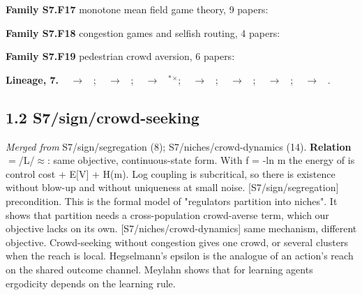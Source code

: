 \documentclass[10pt]{article}
\newcommand{\memb}[1]{\par\smallskip\textbf{#1}\quad}
\begin{document}
\memb{Family S7.F17} monotone mean field game theory, 9 papers: {\footnotesize \citetext{\citealp{Lasry-mean07}; \citealp{Lasry-jeux06a}; \citealp{Lasry-jeux06b}; \citealp{Gueant-mean11}; \citealp{Bensoussan-mean13}\dag; \citealp{Bardi-linear14}; \citealp{Carmona-probabilistic18}\dag; \citealp{Cardaliaguet-introduction20}\dag; \citealp{Bakaryan-regularity23}}}

\memb{Family S7.F18} congestion games and selfish routing, 4 papers: {\footnotesize \citetext{\citealp{Wardrop-some52}\dag; \citealp{Rosenthal-class73}\dag; \citealp{Milchtaich-congestion96}\dag; \citealp{Roughgarden-how02}}}

\memb{Family S7.F19} pedestrian crowd aversion, 6 papers: {\footnotesize \citetext{\citealp{Hughes-continuum02}; \citealp{Lachapelle-mean11}; \citealp{Aurell-mean18}; \citealp{Bonnemain-schrodinger20}; \citealp{Bonnemain-pedestrians22}; \citealp{Po-rerouting24}}}

\memb{Lineage, 7.} {\footnotesize \citeauthor{Wardrop-some52}~\citeyear{Wardrop-some52} $\to$ \citeauthor{Roughgarden-how02}~\citeyear{Roughgarden-how02}; \citeauthor{Rosenthal-class73}~\citeyear{Rosenthal-class73} $\to$ \citeauthor{Milchtaich-congestion96}~\citeyear{Milchtaich-congestion96}; \citeauthor{Rosenthal-class73}~\citeyear{Rosenthal-class73} $\to$ \citeauthor{Monderer-potential96}~\citeyear{Monderer-potential96}$^\ast$$^\times$; \citeauthor{Lasry-jeux06a}~\citeyear{Lasry-jeux06a} $\to$ \citeauthor{Achdou-mean17}~\citeyear{Achdou-mean17}; \citeauthor{Lasry-mean07}~\citeyear{Lasry-mean07} $\to$ \citeauthor{Cirant-stationary16}~\citeyear{Cirant-stationary16}; \citeauthor{Lasry-mean07}~\citeyear{Lasry-mean07} $\to$ \citeauthor{Briani-stable17}~\citeyear{Briani-stable17}; \citeauthor{Lasry-mean07}~\citeyear{Lasry-mean07} $\to$ \citeauthor{Perrin-fictitious20}~\citeyear{Perrin-fictitious20}.}

\subsection{1.2 S7/sign/crowd-seeking}\label{node:S7-S7-sign-crowd-seeking}
\textit{Merged from} S7/sign/segregation (8); S7/niches/crowd-dynamics (14). \textbf{Relation} $=$/\textsf{L}/$\approx$: same objective, continuous-state form. With f = -ln m the energy of \citet{Cesaroni-concentration19} is control cost + E[V] + H(m). Log coupling is subcritical, so there is existence without blow-up and without uniqueness at small noise. [S7/sign/segregation] precondition. This is the formal model of "regulators partition into niches". It shows that partition needs a cross-population crowd-averse term, which our objective lacks on its own. [S7/niches/crowd-dynamics] same mechanism, different objective. Crowd-seeking without congestion gives one crowd, or several clusters when the reach is local. Hegselmann's epsilon is the analogue of an action's reach on the shared outcome channel. Meylahn shows that for learning agents ergodicity depends on the learning rule.
\end{document}

